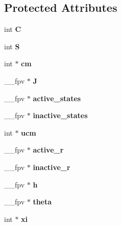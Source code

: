 \subsection*{Protected Attributes}
\begin{DoxyCompactItemize}
\item 
int {\bfseries C}\hypertarget{classLC__PNet_ac6fbf61a77df3fefd1add38665e7b717}{}\label{classLC__PNet_ac6fbf61a77df3fefd1add38665e7b717}

\item 
int {\bfseries S}\hypertarget{classLC__PNet_ab6a71cf2a87d2a84ef26d63da7cb28c7}{}\label{classLC__PNet_ab6a71cf2a87d2a84ef26d63da7cb28c7}

\item 
int $\ast$ {\bfseries cm}\hypertarget{classLC__PNet_a4d5e6bfeff710d069640abaabf92e9d8}{}\label{classLC__PNet_a4d5e6bfeff710d069640abaabf92e9d8}

\item 
\+\_\+\+\_\+fpv $\ast$ {\bfseries J}\hypertarget{classLC__PNet_a07424445de5664c7840fa76867d01491}{}\label{classLC__PNet_a07424445de5664c7840fa76867d01491}

\item 
\+\_\+\+\_\+fpv $\ast$ {\bfseries active\+\_\+states}\hypertarget{classLC__PNet_a4c085a26d4bc5cc9c048f5652bf7d3c7}{}\label{classLC__PNet_a4c085a26d4bc5cc9c048f5652bf7d3c7}

\item 
\+\_\+\+\_\+fpv $\ast$ {\bfseries inactive\+\_\+states}\hypertarget{classLC__PNet_aa286239886cffadfb0098b4af9391cfd}{}\label{classLC__PNet_aa286239886cffadfb0098b4af9391cfd}

\item 
int $\ast$ {\bfseries ucm}\hypertarget{classLC__PNet_af1e4cb3b01d9eea8dc4ee932ac486f5f}{}\label{classLC__PNet_af1e4cb3b01d9eea8dc4ee932ac486f5f}

\item 
\+\_\+\+\_\+fpv $\ast$ {\bfseries active\+\_\+r}\hypertarget{classLC__PNet_a232191ada434e427069b9d73a32c6c11}{}\label{classLC__PNet_a232191ada434e427069b9d73a32c6c11}

\item 
\+\_\+\+\_\+fpv $\ast$ {\bfseries inactive\+\_\+r}\hypertarget{classLC__PNet_a4eefb8f8377ce107099d63bbc3b129bf}{}\label{classLC__PNet_a4eefb8f8377ce107099d63bbc3b129bf}

\item 
\+\_\+\+\_\+fpv $\ast$ {\bfseries h}\hypertarget{classLC__PNet_a0f89876853795e0366d6f771295ec785}{}\label{classLC__PNet_a0f89876853795e0366d6f771295ec785}

\item 
\+\_\+\+\_\+fpv $\ast$ {\bfseries theta}\hypertarget{classLC__PNet_ab4352d5dd32171b45a3471be0de07a77}{}\label{classLC__PNet_ab4352d5dd32171b45a3471be0de07a77}

\item 
int $\ast$ {\bfseries xi}\hypertarget{classLC__PNet_ade19ecf3ac391db683a740bde9fde66b}{}\label{classLC__PNet_ade19ecf3ac391db683a740bde9fde66b}

\end{DoxyCompactItemize}
